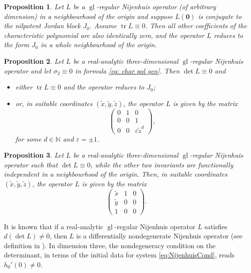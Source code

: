 \documentclass[12pt]{article}
\theoremstyle{plain}
\newtheorem{Proposition}{Proposition}
\begin{document}
\begin{Proposition} \label{st: tr L = 0}
    Let $L$ be a $\operatorname{gl}$-regular Nijenhuis operator (of arbitrary dimension) in a neighbourhood of the origin and suppose $L(\mathbf{0})$ is conjugate to the nilpotent Jordan block $J_0$. Assume $\operatorname{tr} L \equiv 0$. Then all other coefficients of the characteristic polynomial are also identically zero, and the operator $L$ reduces to the form $J_0$ in a whole neighbourhood of the origin.
\end{Proposition}

\begin{Proposition}
    Let $L$ be a real-analytic three-dimensional $\operatorname{gl}$-regular Nijenhuis operator and let $\sigma_2 \equiv 0$ in formula \eqref{eq: char pol gen}. Then $\det L \equiv 0$ and
    \begin{itemize}
        \item either $\operatorname{tr}L \equiv 0$ and the operator reduces to $J_0$;
        \item or, in suitable coordinates $(\tilde{x}, \tilde{y}, \tilde{z})$, the operator $L$ is given by the matrix
        \[
            \begin{pmatrix}
                0 & 1 & 0 \\
                0 & 0 & 1 \\
                0 & 0 & \varepsilon \tilde{z}^d
            \end{pmatrix},
        \]
        for some $d \in \mathbb{N}$ and $\varepsilon = \pm 1$.
    \end{itemize}
\end{Proposition}

\begin{Proposition}
    Let $L$ be a real-analytic three-dimensional $\operatorname{gl}$-regular Nijenhuis operator such that $\det L \equiv 0$, while the other two invariants are functionally independent in a neighbourhood of the origin.
    Then, in suitable coordinates $(\tilde{x}, \tilde{y}, \tilde{z})$, the operator $L$ is given by the matrix
    \[
    \begin{pmatrix}
        \tilde{x} & 1 & 0 \\
        \tilde{y} & 0 & 0 \\
        1 & 0 & 0
    \end{pmatrix}.
    \]
\end{Proposition}

It is known that if a real-analytic $\operatorname{gl}$-regular Nijenhuis operator $L$ satisfies $d(\det L) \neq 0$, then $L$ is a differentially nondegenerate Nijenhuis operator (see definition in \cite{bolsinov2022nijenhuisNGI}). In dimension three, the nondegeneracy condition on the determinant, in terms of the initial data for system \eqref{eq:NijenhuisCond}, reads $h_0'(0)\neq 0$.
\end{document}

